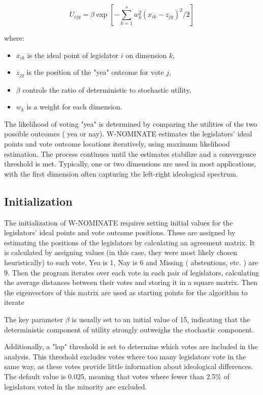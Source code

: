 \documentclass{report}
\begin{document}
    \[
        U_{ijy} = \beta \exp \left[ -\sum_{k=1}^{s} w_k^2 (x_{ik} - z_{jy})^2 / 2 \right]
    \]

    where:
    \begin{itemize}
        \item \( x_{ik} \) is the ideal point of legislator \(i\) on dimension \(k\),
        \item \( z_{jy} \) is the position of the "yea" outcome for vote \(j\),
        \item \( \beta \) controls the ratio of deterministic to stochastic utility,
        \item \( w_k \) is a weight for each dimension.
    \end{itemize}

    The likelihood of voting "yea" is determined by comparing the utilities of the two possible outcomes (
    yea or nay). W-NOMINATE estimates the legislators' ideal points and vote outcome locations iteratively,
    using maximum likelihood estimation. The process continues until the estimates stabilize and a
    convergence threshold is met. Typically, one or two dimensions are used in most applications, with the
    first dimension often capturing the left-right ideological spectrum.

    \subsection{Initialization}
    The initialization of W-NOMINATE requires setting initial values for the legislators' ideal points and
    vote outcome positions. These are assigned by estimating the positions of
    the legislators by calculating an agreement matrix. It is calculated by assigning values (in this
    case, they were most likely chosen heuristically) to each vote, Yea is 1, Nay is 6 and Missing (
    abstentions, etc. ) are 9. Then the program iterates over each vote in each pair of legislators,
    calculating the average distances between their votes and storing it in a square matrix. Then the
    eigenvectors of this matrix are used as starting points for the algorithm to iterate


    The key parameter \( \beta \) is usually set to an initial value of 15, indicating that the
    deterministic component of utility
    strongly outweighs the stochastic component.

    Additionally, a "lop" threshold is set to determine which votes are included in the analysis.
    This threshold excludes votes where too many legislators vote in the same way, as these votes
    provide little information about ideological differences. The default value is 0.025,
    meaning that votes where fewer than 2.5\% of legislators voted in the minority are excluded.
\end{document}
